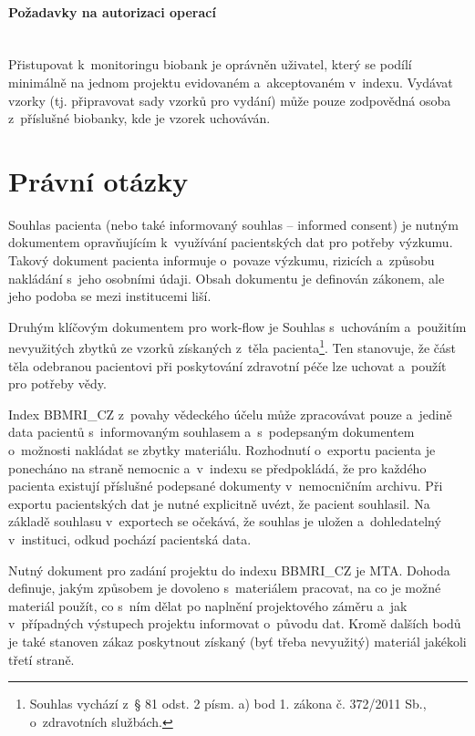 \documentclass[11pt, final, oneside]{fithesis2}
\newcommand{\paragraphNewLine}[1]{\paragraph*{#1}\mbox{}\\}
\newcommand{\ProjectName}{\mbox{BBMRI\_CZ}\xspace}
\begin{document}
\paragraphNewLine{Požadavky na autorizaci operací}
Přistupovat k~monitoringu biobank je oprávněn uživatel, který se podílí minimálně na jednom projektu evidovaném a~akceptovaném v~indexu.
Vydávat vzorky (tj. připravovat sady vzorků pro vydání) může pouze zodpovědná osoba z~příslušné biobanky, kde je vzorek uchováván.

\section{Právní otázky}\label{chapter:analysis:section:legal}
Souhlas pacienta (nebo také informovaný souhlas -- informed consent) je nutným dokumentem opravňujícím k~využívání pacientských dat pro potřeby výzkumu. Takový dokument pacienta informuje o~povaze výzkumu, rizicích a~způsobu nakládání s~jeho osobními údaji. Obsah dokumentu je definován zákonem, ale jeho podoba se mezi institucemi liší. 

Druhým klíčovým dokumentem pro work-flow je Souhlas s~uchováním a~použitím nevyužitých zbytků ze vzorků získaných z~těla pacienta\footnote{Souhlas vychází z~§ 81 odst. 2 písm. a) bod 1. zákona č. 372/2011 Sb., o~zdravotních službách.}. Ten stanovuje, že část těla odebranou pacientovi při poskytování zdravotní péče lze uchovat a~použít pro potřeby vědy. 

Index \ProjectName z~povahy vědeckého účelu může zpracovávat pouze a~jedině data pacientů s~informovaným souhlasem a~s~podepsaným dokumentem o~možnosti nakládat se zbytky materiálu. Rozhodnutí o~exportu pacienta je ponecháno na straně nemocnic a~v~indexu se předpokládá, že pro každého pacienta existují příslušné podepsané dokumenty v~nemocničním archivu.
Při exportu pacientských dat je nutné explicitně uvézt, že pacient souhlasil. Na základě souhlasu v~exportech se očekává, že souhlas je uložen a~dohledatelný  v~instituci, odkud pochází pacientská data.

Nutný dokument pro zadání projektu do indexu \ProjectName je MTA. Dohoda definuje, jakým způsobem je dovoleno s~materiálem pracovat, na co je možné materiál použít, co s~ním dělat po naplnění projektového záměru a~jak v~případných výstupech projektu informovat o~původu dat. Kromě dalších bodů je také stanoven zákaz poskytnout získaný (byť třeba nevyužitý) materiál jakékoli třetí straně.


\end{document}
